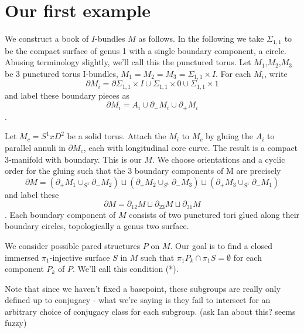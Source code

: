 \documentclass[12pt]{amsart}
\theoremstyle{definition}
\newcommand{\x}{\times}
\newcommand{\bd}{\partial}
\newcommand{\Si}{\Sigma}
\begin{document}
\section{Our first example}

We construct a book of $I$-bundles $M$ as follows. In the following we take
$\Si_{1,1}$ to be the compact surface of genus 1 with a single boundary
component, a circle.  Abusing terminology slightly, we'll call this the
punctured torus.  Let $M_1$,$M_2$,$M_3$ be 3 punctured torus I-bundles,
$M_1=M_2=M_3=\Si_{1,1}\x I$. For each $M_i$, write
\[
\bd M_i = \bd \Si_{1,1}\x I \cup \Si_{1,1}\x0 \cup \Si_{1,1} \x 1
\]
and label these boundary pieces as
\[
\bd M_i = A_i \cup \bd_- M_i \cup \bd_+M_i
\].

Let $M_c = S^1xD^2$ be a solid torus. Attach the $M_i$ to $M_c$ by gluing the
$A_i$ to parallel annuli in $\bd M_c$, each with longitudinal core curve. The
result is a compact 3-manifold with boundary. This is our $M$. We choose
orientations and a cyclic order for the gluing such that the 3 boundary
components of M are precisely
\[
\bd M = (\bd_+M_1 \cup_{S^1} \bd_-M_2) \sqcup (\bd_+M_2 \cup_{S^1} \bd_-M_3)
\sqcup (\bd_+M_3 \cup_{S^1} \bd_-M_1)
\]
and label these
\[
\bd M=\bd_{12}M \sqcup \bd_{23}M \sqcup \bd_{31}M
\].
Each boundary
component of $M$ consists of two punctured tori glued along their boundary
circles, topologically a genus two surface.

We consider possible pared structures $P$ on $M$. Our goal is to find a closed
immersed $\pi_1$-injective surface $S$ in $M$ such that $\pi_1P_k \cap \pi_1S
= \emptyset$
for each component $P_k$ of $P$. We'll call this condition (*).

Note that since we
haven't fixed a basepoint, these subgroups are really only defined up to
conjugacy - what we're saying is they fail to intersect for an arbitrary choice
of conjugacy class for each subgroup. (ask Ian about this? seems fuzzy)
\end{document}
